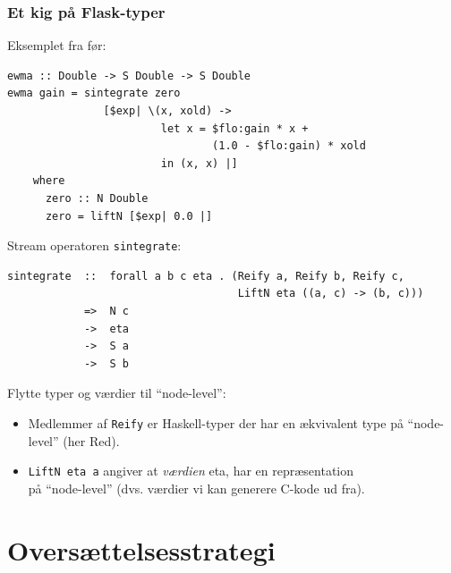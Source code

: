 \documentclass{beamer}
\begin{document}
\begin{frame}[t, fragile]
  \frametitle{Et kig på Flask-typer}
Eksemplet fra før:
  \tiny
\begin{verbatim}
ewma :: Double -> S Double -> S Double
ewma gain = sintegrate zero
               [$exp| \(x, xold) ->
                        let x = $flo:gain * x +
                                (1.0 - $flo:gain) * xold
                        in (x, x) |]
    where
      zero :: N Double
      zero = liftN [$exp| 0.0 |]
\end{verbatim}
\normalsize
\pause

Stream operatoren \verb|sintegrate|:
\tiny
\begin{verbatim}
sintegrate  ::  forall a b c eta . (Reify a, Reify b, Reify c,
                                    LiftN eta ((a, c) -> (b, c)))
            =>  N c
            ->  eta
            ->  S a
            ->  S b
\end{verbatim}
\normalsize

\pause
Flytte typer og værdier til ``node-level'':

\begin{itemize}
\item Medlemmer af \verb|Reify| er Haskell-typer der har en ækvivalent
  type på ``node-level'' (her Red). 
\pause
\item \verb|LiftN eta a| angiver at \textit{værdien} eta, har en
  repræsentation \\ på ``node-level'' (dvs. værdier vi kan generere
  C-kode ud fra).
\end{itemize}

\end{frame}


\section{Oversættelsesstrategi}
\end{document}
